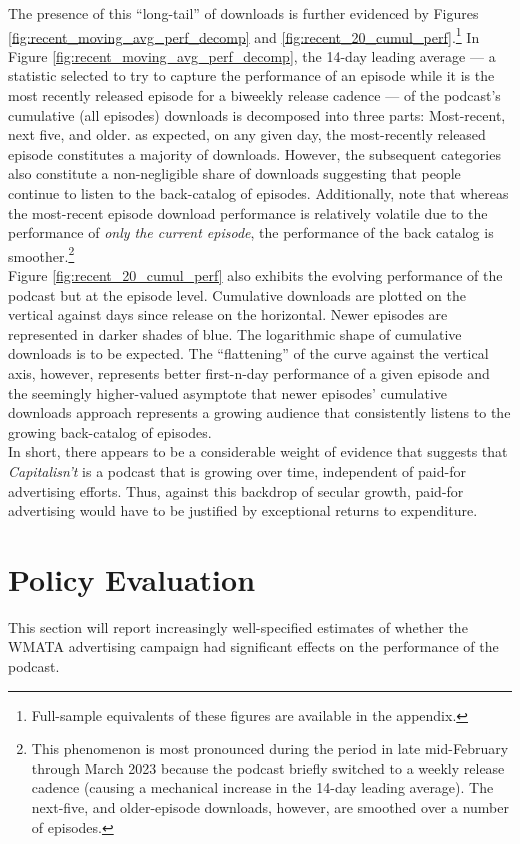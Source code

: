 \documentclass[11pt, letterpaper, twoside]{article}
\begin{document}
The presence of this ``long-tail'' of downloads is further evidenced by Figures \ref{fig:recent_moving_avg_perf_decomp} and \ref{fig:recent_20_cumul_perf}.\footnote{Full-sample equivalents of these figures are available in the appendix.} In Figure \ref{fig:recent_moving_avg_perf_decomp}, the 14-day leading average --- a statistic selected to try to capture the performance of an episode while it is the most recently released episode for a biweekly release cadence --- of the podcast's cumulative (all episodes) downloads is decomposed into three parts: Most-recent, next five, and older. as expected, on any given day, the most-recently released episode constitutes a majority of downloads. However, the subsequent categories also constitute a non-negligible share of downloads suggesting that people continue to listen to the back-catalog of episodes. Additionally, note that whereas the most-recent episode download performance is relatively volatile due to the performance of \textit{only the current episode}, the performance of the back catalog is smoother.\footnote{This phenomenon is most pronounced during the period in late mid-February through March 2023 because the podcast briefly switched to a weekly release cadence (causing a mechanical increase in the 14-day leading average). The next-five, and older-episode downloads, however, are smoothed over a number of episodes.}\\

Figure \ref{fig:recent_20_cumul_perf} also exhibits the evolving performance of the podcast but at the episode level. Cumulative downloads are plotted on the vertical against days since release on the horizontal. Newer episodes are represented in darker shades of blue. The logarithmic shape of cumulative downloads is to be expected. The ``flattening'' of the curve against the vertical axis, however, represents better first-n-day performance of a given episode and the seemingly higher-valued asymptote that newer episodes' cumulative downloads approach represents a growing audience that consistently listens to the growing back-catalog of episodes.\\

In short, there appears to be a considerable weight of evidence that suggests that \textit{Capitalisn't} is a podcast that is growing over time, independent of paid-for advertising efforts. Thus, against this backdrop of secular growth, paid-for advertising would have to be justified by exceptional returns to expenditure.

\section{Policy Evaluation}
This section will report increasingly well-specified estimates of whether the WMATA advertising campaign had significant effects on the performance of the podcast.
\end{document}
